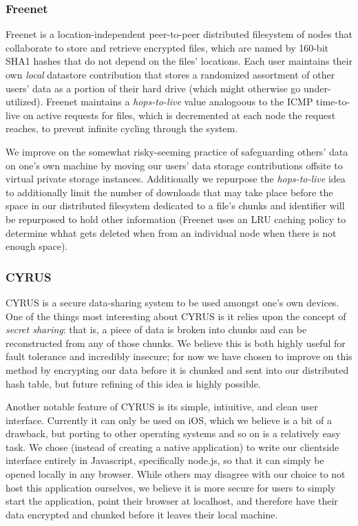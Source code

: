 \subsubsection*{Freenet}

Freenet is a location-independent peer-to-peer distributed filesystem of nodes that collaborate to store and retrieve encrypted files,
which are named by 160-bit SHA1 hashes that do not depend on the files' locations. Each user maintains their own \textit{local} datastore
contribution that stores a randomized assortment of other users' data as a portion of their hard drive (which might otherwise go
under-utilized). Freenet maintains a \textit{hops-to-live} value analogoous to
the ICMP time-to-live on active requests for files, which is decremented at each node the request reaches, to prevent infinite cycling
through the system.

We improve on the somewhat risky-seeming practice of safeguarding others' data on one's own machine by moving our
users' data storage contributions offsite to virtual private storage instances.
Additionally we repurpose the \textit{hops-to-live} idea to additionally limit the number of
downloads that may take place before the space in our distributed filesystem dedicated to a file's chunks and identifier will be
repurposed to hold other information (Freenet uses an LRU caching policy to determine whhat gets deleted when from an individual node
when there is not enough space).

\subsubsection*{CYRUS} %

CYRUS is a secure data-sharing system to be used amongst one's own devices. One of the things most interesting about CYRUS is it relies
upon the concept of \textit{secret sharing}: that is, a piece of data is broken into chunks and can be reconstructed from any of those
chunks. We believe this is both highly useful for fault tolerance and incredibly insecure; for now we have chosen to improve on this
method by encrypting our data before it is chunked and sent into our distributed hash table, but future refining of this idea is highly
possible.

Another notable feature of CYRUS is its simple, intiuitive, and clean user interface.
Currently it can only be used on iOS, which we believe is a bit
of a drawback, but porting to other operating systems and so on is a relatively easy task. We chose (instead of creating a native
application) to write our clientside interface entirely in Javascript, specifically node.js, so that it can simply be opened locally
in any browser. While others may disagree with our choice to not host this application ourselves, we believe it is more secure for users
to simply start the application, point their browser at localhost, and therefore have their data encrypted and chunked before
it leaves their local machine.


